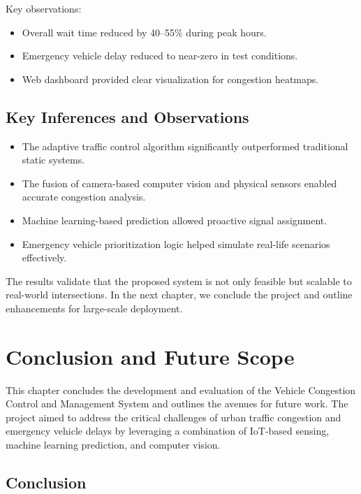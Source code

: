 \documentclass[12pt]{report}
\begin{document}
Key observations:
\begin{itemize}
    \item Overall wait time reduced by 40--55\% during peak hours.
    \item Emergency vehicle delay reduced to near-zero in test conditions.
    \item Web dashboard provided clear visualization for congestion heatmaps.
\end{itemize}

\section{Key Inferences and Observations}

\begin{itemize}
    \item The adaptive traffic control algorithm significantly outperformed traditional static systems.
    \item The fusion of camera-based computer vision and physical sensors enabled accurate congestion analysis.
    \item Machine learning-based prediction allowed proactive signal assignment.
    \item Emergency vehicle prioritization logic helped simulate real-life scenarios effectively.
\end{itemize}

\vspace{0.5cm}

The results validate that the proposed system is not only feasible but scalable to real-world intersections. In the next chapter, we conclude the project and outline enhancements for large-scale deployment.


\chapter{Conclusion and Future Scope}

This chapter concludes the development and evaluation of the Vehicle Congestion Control and Management System and outlines the avenues for future work. The project aimed to address the critical challenges of urban traffic congestion and emergency vehicle delays by leveraging a combination of IoT-based sensing, machine learning prediction, and computer vision.

\section{Conclusion}
\end{document}
